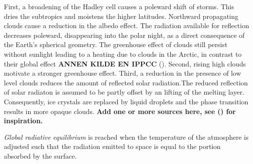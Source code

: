 First, a broadening of the Hadley cell causes a poleward shift of storms. This dries the subtropics and moistens the higher latitudes. Northward propagating clouds cause a reduction in the albedo effect. The radiation available for reflection decreases poleward, disappearing into the polar night, as a direct consequence of the Earth's spherical geometry.
The greenhouse effect of clouds still persist without sunlight leading to a heating due to clouds in the Arctic, in contrast to their global effect \textbf{ANNEN KILDE EN IPPCC} (\cite{IPCC_CH7_clouds}).
Second, rising high clouds motivate a stronger greenhouse effect. Third, a reduction in the presence of low level clouds reduces the amount of reflected solar radiation.The reduced reflection of solar radiaton is assumed to be partly offset by an lifting of the melting layer. Consequently, ice crystals are replaced by liquid droplets and the phase transition results in more opaque clouds. \textbf{Add one or more sources here, see (\cite{IPCC_CH7_clouds}) for inspiration.} 

\textit{Global radiative equilibrium} is reached when the temperature of the atmosphere is adjusted such that the radiation emitted to space is equal to the portion absorbed by the surface.
